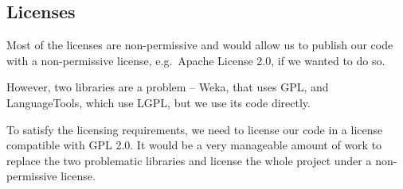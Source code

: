 \subsection*{Licenses}
Most of the licenses are non-permissive and would allow us to publish our code with a non-permissive license, e.g.\ Apache License 2.0, if we wanted to do so.

However, two libraries are a problem -- Weka, that uses GPL, and LanguageTools, which use LGPL, but we use its code directly.

To satisfy the licensing requirements, we need to license our code in a license compatible with GPL 2.0. It would be a very manageable amount of work to replace the two problematic libraries and license the whole project under a non-permissive license.